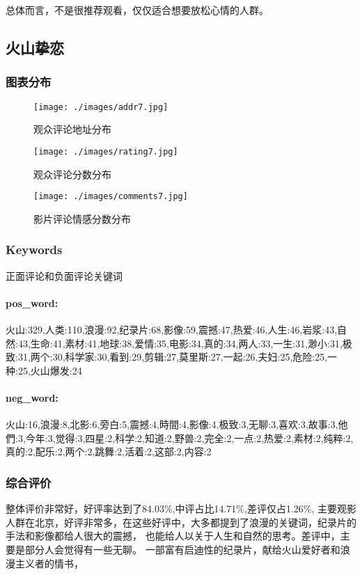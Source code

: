 \documentclass[12pt]{article}
\begin{document}
总体而言，不是很推荐观看，仅仅适合想要放松心情的人群。

\subsection*{火山挚恋}
\subsubsection*{图表分布}
\begin{figure}[H]
    \centering
    \begin{minipage}[t]{0.48\textwidth}
    \centering
    \texttt{[image: ./images/addr7.jpg]}
    \caption{观众评论地址分布}
    \end{minipage}
    \begin{minipage}[t]{0.48\textwidth}
    \centering
    \texttt{[image: ./images/rating7.jpg]}
    \caption{观众评论分数分布}
    \end{minipage}
\end{figure}
\begin{figure}[H]
    \centering
    \texttt{[image: ./images/comments7.jpg]}
    \caption{影片评论情感分数分布} 
\end{figure}
\subsubsection*{Keywords}
正面评论和负面评论关键词
\paragraph*{pos\_word:}
火山:329,人类:110,浪漫:92,纪录片:68,影像:59,震撼:47,热爱:46,人生:46,岩浆:43,自然:43,生命:41,素材:41,地球:38,爱情:35,电影:34,真的:34,两人:33,一生:31,渺小:31,极致:31,两个:30,科学家:30,看到:29,剪辑:27,莫里斯:27,一起:26,夫妇:25,危险:25,一种:25,火山爆发:24
\paragraph*{neg\_word:}
火山:16,浪漫:8,北影:6,旁白:5,震撼:4,時間:4,影像:4,极致:3,无聊:3,喜欢:3,故事:3,他們:3,今年:3,觉得:3,四星:2,科学:2,知道:2,野兽:2,完全:2,一点:2,热爱:2,素材:2,纯粹:2,真的:2,配乐:2,两个:2,跳舞:2,活着:2,这部:2,内容:2
\subsubsection*{综合评价}
整体评价非常好，好评率达到了84.03\%,中评占比14.71\%,差评仅占1.26\%,
主要观影人群在北京，好评非常多，在这些好评中，大多都提到了浪漫的关键词，纪录片的手法和影像都给人很大的震撼，
也能给人以关于人生和自然的思考。差评中，主要是部分人会觉得有一些无聊。
一部富有启迪性的纪录片，献给火山爱好者和浪漫主义者的情书，
\end{document}
